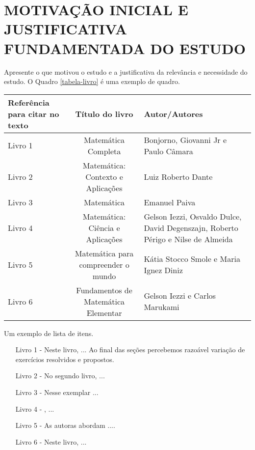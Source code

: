\chapter{MOTIVAÇÃO INICIAL E JUSTIFICATIVA FUNDAMENTADA DO ESTUDO}
\label{cap1}
\thispagestyle{empty}

Apresente o que motivou o estudo e a justificativa da relevância e necessidade do estudo. O Quadro \ref{tabela-livro} é uma exemplo de quadro.

  \begin{tabular}{|p{3cm}||c||p{4cm}|}
      \hline
      \textbf{Referência para citar no texto}    & \textbf {Título do livro} & \textbf {Autor/Autores} \\
  \hline
  \hline
  \label{livro 1}Livro 1 & Matemática Completa&Bonjorno, Giovanni Jr e Paulo Câmara \\ 
  \hline
 \label{livro 2}Livro 2 & Matemática: Contexto e Aplicações & Luiz Roberto Dante\\ 
 \hline
 \label{livro 3}Livro 3 & Matemática & Emanuel Paiva \\ 
 \hline
  \label{livro 4}Livro 4 & Matemática: Ciência e Aplicações  &Gelson Iezzi, Osvaldo Dulce, David Degenszajn, Roberto Périgo e Nilse de Almeida \\ 
  \hline
  \label{livro 5}Livro 5 & Matemática para compreender o mundo & Kátia Stocco Smole e Maria Ignez Diniz \\ 
 
 \hline
  \label{livro 6}Livro 6 & Fundamentos de Matemática Elementar & Gelson Iezzi e Carlos Marukami \\ 
 \hline

 \end{tabular}
\vspace{0.5cm}


Um exemplo de lista de itens.

\begin{itemize}
 \item [Livro 1 -\nocite{matcompleta}]  Neste livro, ... Ao final das seções percebemos razoável variação de exercícios resolvidos e propostos.
\vspace{0.5cm}
	 
\item [Livro 2 -\nocite{dante2010matematica}] No segundo livro, ... 
\vspace{0.5cm}

\item [Livro 3 -\nocite{paiva2010matematica}]   Nesse exemplar ... 
\vspace{0.5cm}

\item [Livro 4 - ]   , ...
\vspace{0.5cm}

\item [Livro 5 -\nocite{smole2016matematica}] As autoras abordam ....
\vspace{0.5cm}

\item [Livro 6 -]  Neste livro, ...
\vspace{0.5cm}
 \end{itemize}

